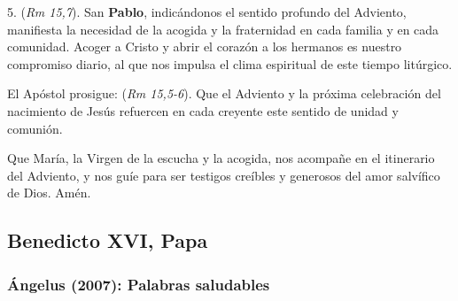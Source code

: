 \begin{body}
	5.  (\emph{Rm 15,7}). San \textbf{Pablo}, indicándonos el sentido profundo del Adviento, manifiesta la necesidad de la acogida y la fraternidad en cada familia y en cada comunidad. Acoger a Cristo y abrir el corazón a los hermanos es nuestro compromiso diario, al que nos impulsa el clima espiritual de este tiempo litúrgico. 
	
	El Apóstol prosigue:  (\emph{Rm 15,5-6}). Que el Adviento y la próxima celebración del nacimiento de Jesús refuercen en cada creyente este sentido de unidad y comunión. 
	
	Que María, la Virgen de la escucha y la acogida, nos acompañe en el itinerario del Adviento, y nos guíe para ser testigos creíbles y generosos del amor salvífico de Dios. Amén.
\end{body}

\newsection 

\subsection{Benedicto XVI, Papa}

\subsubsection{Ángelus (2007): Palabras saludables}


